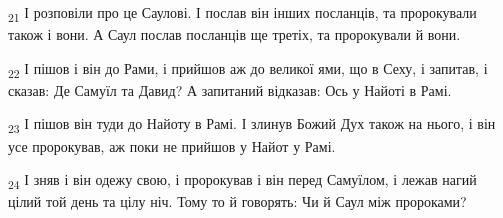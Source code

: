 \begin{tcolorbox}
\textsubscript{21} І розповіли про це Саулові. І послав він інших посланців, та пророкували також і вони. А Саул послав посланців ще третіх, та пророкували й вони.
\end{tcolorbox}
\begin{tcolorbox}
\textsubscript{22} І пішов і він до Рами, і прийшов аж до великої ями, що в Сеху, і запитав, і сказав: Де Самуїл та Давид? А запитаний відказав: Ось у Найоті в Рамі.
\end{tcolorbox}
\begin{tcolorbox}
\textsubscript{23} І пішов він туди до Найоту в Рамі. І злинув Божий Дух також на нього, і він усе пророкував, аж поки не прийшов у Найот у Рамі.
\end{tcolorbox}
\begin{tcolorbox}
\textsubscript{24} І зняв і він одежу свою, і пророкував і він перед Самуїлом, і лежав нагий цілий той день та цілу ніч. Тому то й говорять: Чи й Саул між пророками?
\end{tcolorbox}
